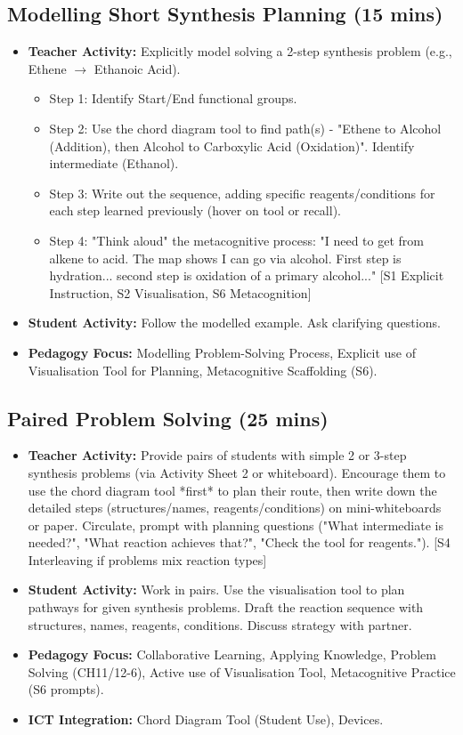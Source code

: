 \documentclass[11pt, a4paper]{article}
\begin{document}
\subsection*{Modelling Short Synthesis Planning (15 mins)}
\begin{itemize}
    \item \textbf{Teacher Activity:} Explicitly model solving a 2-step synthesis problem (e.g., Ethene $\rightarrow$ Ethanoic Acid).
        \begin{itemize}
            \item Step 1: Identify Start/End functional groups.
            \item Step 2: Use the chord diagram tool to find path(s) - "Ethene to Alcohol (Addition), then Alcohol to Carboxylic Acid (Oxidation)". Identify intermediate (Ethanol).
            \item Step 3: Write out the sequence, adding specific reagents/conditions for each step learned previously (hover on tool or recall).
            \item Step 4: "Think aloud" the metacognitive process: "I need to get from alkene to acid. The map shows I can go via alcohol. First step is hydration... second step is oxidation of a primary alcohol..." [S1 Explicit Instruction, S2 Visualisation, S6 Metacognition]
        \end{itemize}
    \item \textbf{Student Activity:} Follow the modelled example. Ask clarifying questions.
    \item \textbf{Pedagogy Focus:} Modelling Problem-Solving Process, Explicit use of Visualisation Tool for Planning, Metacognitive Scaffolding (S6).
\end{itemize}

\subsection*{Paired Problem Solving (25 mins)}
\begin{itemize}
    \item \textbf{Teacher Activity:} Provide pairs of students with simple 2 or 3-step synthesis problems (via Activity Sheet 2 or whiteboard). Encourage them to use the chord diagram tool *first* to plan their route, then write down the detailed steps (structures/names, reagents/conditions) on mini-whiteboards or paper. Circulate, prompt with planning questions ("What intermediate is needed?", "What reaction achieves that?", "Check the tool for reagents."). [S4 Interleaving if problems mix reaction types]
    \item \textbf{Student Activity:} Work in pairs. Use the visualisation tool to plan pathways for given synthesis problems. Draft the reaction sequence with structures, names, reagents, conditions. Discuss strategy with partner.
    \item \textbf{Pedagogy Focus:} Collaborative Learning, Applying Knowledge, Problem Solving (CH11/12-6), Active use of Visualisation Tool, Metacognitive Practice (S6 prompts).
    \item \textbf{ICT Integration:} Chord Diagram Tool (Student Use), Devices.
\end{itemize}
\end{document}
